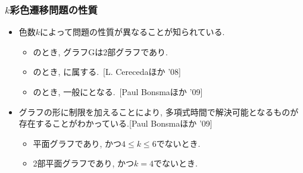 \begin{frame}\frametitle{$k$彩色遷移問題の性質}

  \begin{itemize}
    \item 色数$k$によって問題の性質が異なることが知られている.
    \begin{itemize}
      \item {}のとき, グラフGは2部グラフであり.
      \item {}のとき, に属する.~[L. Cerecedaほか '08]
      \item {}のとき, 一般にとなる.~[Paul Bonsmaほか '09]
    \end{itemize}

    \item グラフの形に制限を加えることにより, 多項式時間で解決可能となるものが存在することがわかっている.[Paul Bonsmaほか '09]
    \begin{itemize}
      \item 平面グラフであり, かつ$4 \le k \le 6$でないとき.
      \item 2部平面グラフであり, かつ$k=4$でないとき.
    \end{itemize}

  \end{itemize}

\end{frame}

\begin{comment}

\begin{frame}{クラスPSPACE}
  \begin{itemize}
    \item 計算量のクラスの一つ.
    \item 決定性チューリングマシンに多項式量のメモリを与えることで解決できる問題が属する.
    \item 指数時間で解くことが可能．
    \item P$\subseteq$NP$\subseteq$PSPACEであることはわかっている.
    \begin{itemize}
      \item ただし, 真に包含するかは未解決.
    \end{itemize}
  \end{itemize}
\end{frame}
\end{comment}

